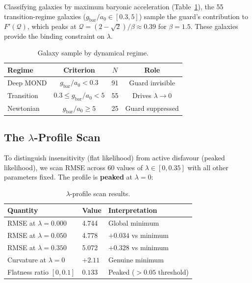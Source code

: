 \documentclass{aa}
\newcommand{\Q}{\mathcal{Q}}
\newcommand{\gbar}{g_\text{bar}}
\newcommand{\azero}{a_0}
\begin{document}
Classifying galaxies by maximum baryonic acceleration (Table~\ref{tab:regimes}),
the 55 transition-regime galaxies ($\gbar/\azero \in [0.3, 5]$) sample the
guard's contribution to $F'(\Q)$, which peaks at
$\Q = (2-\sqrt{2})/\beta \approx 0.39$ for $\beta = 1.5$. These galaxies
provide the binding constraint on $\lambda$.

\begin{table}
  \caption{Galaxy sample by dynamical regime.}
  \label{tab:regimes}
  \centering
  \begin{tabular}{lccc}
    \hline\hline
    Regime & Criterion & $N$ & Role \\
    \hline
    Deep MOND   & $\gbar/\azero < 0.3$           & 91  & Guard invisible \\
    Transition  & $0.3 \leq \gbar/\azero < 5$   & 55  & Drives $\lambda \to 0$ \\
    Newtonian   & $\gbar/\azero \geq 5$          & 25  & Guard suppressed \\
    \hline
  \end{tabular}
\end{table}

\subsection{The $\lambda$-Profile Scan}

To distinguish insensitivity (flat likelihood) from active disfavour (peaked
likelihood), we scan RMSE across 60 values of $\lambda \in [0, 0.35]$ with
all other parameters fixed. The profile is \textbf{peaked} at $\lambda = 0$:

\begin{table}
  \caption{$\lambda$-profile scan results.}
  \label{tab:profile}
  \centering
  \begin{tabular}{lll}
    \hline\hline
    Quantity & Value & Interpretation \\
    \hline
    RMSE at $\lambda = 0.000$ & 4.744 & Global minimum \\
    RMSE at $\lambda = 0.050$ & 4.778 & $+0.034$ vs minimum \\
    RMSE at $\lambda = 0.350$ & 5.072 & $+0.328$ vs minimum \\
    Curvature at $\lambda = 0$ & $+2.11$ & Genuine minimum \\
    Flatness ratio $[0, 0.1]$ & $0.133$ & Peaked ($>0.05$ threshold) \\
    \hline
  \end{tabular}
\end{table}
\end{document}
